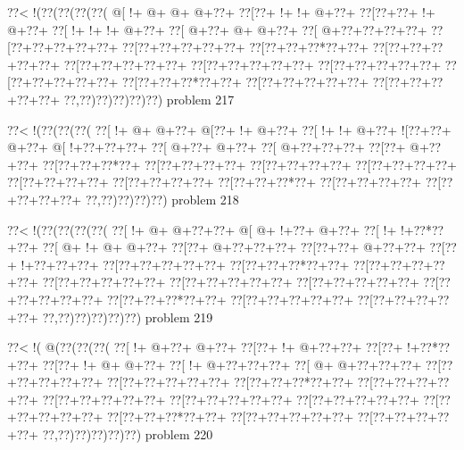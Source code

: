 \vbox{\vbox{\goo
\0??<\- !(\0??(\0??(\0??(\0??(
\- @[\- !+\- @+\- @+\- @+\0??+
\0??[\0??+\- !+\- !+\- @+\0??+
\0??[\0??+\0??+\- !+\- @+\0??+
\0??[\- !+\- !+\- !+\- @+\0??+
\0??[\- @+\0??+\- @+\- @+\0??+
\0??[\- @+\0??+\0??+\0??+\0??+
\0??[\0??+\0??+\0??+\0??+\0??+
\0??[\0??+\0??+\0??+\0??+\0??+
\0??[\0??+\0??+\0??*\0??+\0??+
\0??[\0??+\0??+\0??+\0??+\0??+
\0??[\0??+\0??+\0??+\0??+\0??+
\0??[\0??+\0??+\0??+\0??+\0??+
\0??[\0??+\0??+\0??+\0??+\0??+
\0??[\0??+\0??+\0??+\0??+\0??+
\0??[\0??+\0??+\0??*\0??+\0??+
\0??[\0??+\0??+\0??+\0??+\0??+
\0??[\0??+\0??+\0??+\0??+\0??+
\0??,\0??)\0??)\0??)\0??)\0??)
}
\hfil problem 217\hfil\break
}

\vbox{\vbox{\goo
\0??<\- !(\0??(\0??(\0??(
\0??[\- !+\- @+\- @+\0??+
\- @[\0??+\- !+\- @+\0??+
\0??[\- !+\- !+\- @+\0??+
\- ![\0??+\0??+\- @+\0??+
\- @[\- !+\0??+\0??+\0??+
\0??[\- @+\0??+\- @+\0??+
\0??[\- @+\0??+\0??+\0??+
\0??[\0??+\- @+\0??+\0??+
\0??[\0??+\0??+\0??*\0??+
\0??[\0??+\0??+\0??+\0??+
\0??[\0??+\0??+\0??+\0??+
\0??[\0??+\0??+\0??+\0??+
\0??[\0??+\0??+\0??+\0??+
\0??[\0??+\0??+\0??+\0??+
\0??[\0??+\0??+\0??*\0??+
\0??[\0??+\0??+\0??+\0??+
\0??[\0??+\0??+\0??+\0??+
\0??,\0??)\0??)\0??)\0??)
}
\hfil problem 218\hfil\break
}

\vbox{\vbox{\goo
\0??<\- !(\0??(\0??(\0??(\0??(
\0??[\- !+\- @+\- @+\0??+\0??+
\- @[\- @+\- !+\0??+\- @+\0??+
\0??[\- !+\- !+\0??*\0??+\0??+
\0??[\- @+\- !+\- @+\- @+\0??+
\0??[\0??+\- @+\0??+\0??+\0??+
\0??[\0??+\0??+\- @+\0??+\0??+
\0??[\0??+\- !+\0??+\0??+\0??+
\0??[\0??+\0??+\0??+\0??+\0??+
\0??[\0??+\0??+\0??*\0??+\0??+
\0??[\0??+\0??+\0??+\0??+\0??+
\0??[\0??+\0??+\0??+\0??+\0??+
\0??[\0??+\0??+\0??+\0??+\0??+
\0??[\0??+\0??+\0??+\0??+\0??+
\0??[\0??+\0??+\0??+\0??+\0??+
\0??[\0??+\0??+\0??*\0??+\0??+
\0??[\0??+\0??+\0??+\0??+\0??+
\0??[\0??+\0??+\0??+\0??+\0??+
\0??,\0??)\0??)\0??)\0??)\0??)
}
\hfil problem 219\hfil\break
}

\vbox{\vbox{\goo
\0??<\- !(\- @(\0??(\0??(\0??(
\0??[\- !+\- @+\0??+\- @+\0??+
\0??[\0??+\- !+\- @+\0??+\0??+
\0??[\0??+\- !+\0??*\0??+\0??+
\0??[\0??+\- !+\- @+\- @+\0??+
\0??[\- !+\- @+\0??+\0??+\0??+
\0??[\- @+\- @+\0??+\0??+\0??+
\0??[\0??+\0??+\0??+\0??+\0??+
\0??[\0??+\0??+\0??+\0??+\0??+
\0??[\0??+\0??+\0??*\0??+\0??+
\0??[\0??+\0??+\0??+\0??+\0??+
\0??[\0??+\0??+\0??+\0??+\0??+
\0??[\0??+\0??+\0??+\0??+\0??+
\0??[\0??+\0??+\0??+\0??+\0??+
\0??[\0??+\0??+\0??+\0??+\0??+
\0??[\0??+\0??+\0??*\0??+\0??+
\0??[\0??+\0??+\0??+\0??+\0??+
\0??[\0??+\0??+\0??+\0??+\0??+
\0??,\0??)\0??)\0??)\0??)\0??)
}
\hfil problem 220\hfil\break
}

